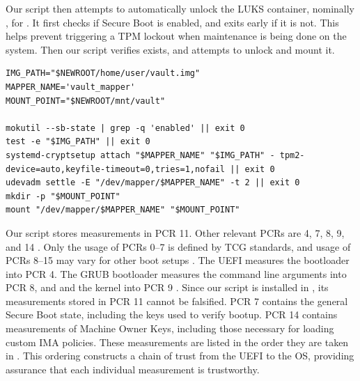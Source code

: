 \documentclass[12pt,letterpaper]{kuthesis}
\begin{document}
Our script then attempts to automatically unlock the LUKS container, nominally \vault, for \wcp.
It first checks if Secure Boot is enabled, and exits early if it is not.
This helps prevent triggering a TPM lockout when maintenance is being done on the system.
Then our script verifies \vault exists, and attempts to unlock and mount it.
\begin{lstlisting}[style=bash]
IMG_PATH="$NEWROOT/home/user/vault.img"
MAPPER_NAME='vault_mapper'
MOUNT_POINT="$NEWROOT/mnt/vault"

mokutil --sb-state | grep -q 'enabled' || exit 0
test -e "$IMG_PATH" || exit 0
systemd-cryptsetup attach "$MAPPER_NAME" "$IMG_PATH" - tpm2-device=auto,keyfile-timeout=0,tries=1,nofail || exit 0
udevadm settle -E "/dev/mapper/$MAPPER_NAME" -t 2 || exit 0
mkdir -p "$MOUNT_POINT"
mount "/dev/mapper/$MAPPER_NAME" "$MOUNT_POINT" 
\end{lstlisting}

Our script stores measurements in PCR 11.
Other relevant PCRs are 4, 7, 8, 9, and 14 \cite{UAPILinuxTPMPCR}.
Only the usage of PCRs 0--7 is defined by TCG standards, and usage of PCRs 8--15 may vary for other boot setups \cite{Trusted-Computing-Group:2023:TCG-PC-Client-PFP}.
The UEFI measures the bootloader into PCR 4.
The GRUB bootloader measures the command line arguments into PCR 8,
and \initramfs and the kernel into PCR 9 \cite{gnu_grub_measured_boot,gentoo_wiki_secure_boot_grub}.
Since our script is installed in \initramfs, its measurements stored in PCR 11 cannot be falsified.
PCR 7 contains the general Secure Boot state, including the keys used to verify bootup.
PCR 14 contains measurements of Machine Owner Keys, including those necessary for loading custom IMA policies.
These measurements are listed in the order they are taken in .
This ordering constructs a chain of trust from the UEFI to the OS,
providing assurance that each individual measurement is trustworthy.
\end{document}
